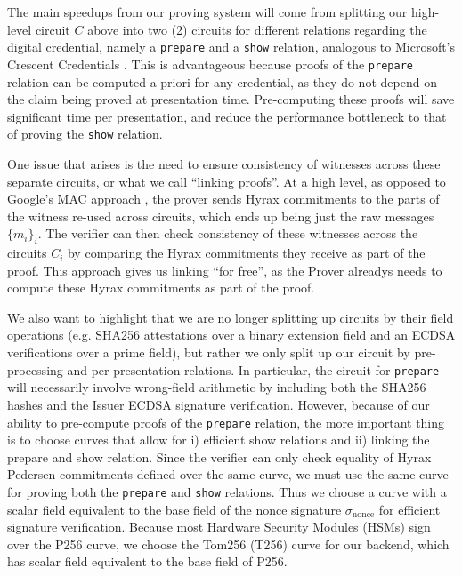 The main speedups from our proving system will come from splitting our high-level circuit $C$ above into two (2) circuits for different relations regarding the digital credential, 
namely a \texttt{prepare} and a \texttt{show} relation, analogous to Microsoft's Crescent Credentials \cite{cryptoeprint:2024/2013}. 
This is advantageous because proofs of the \texttt{prepare} relation can be computed a-priori for any credential, as they do not depend on the claim being proved at presentation time. 
Pre-computing these proofs will save significant time per presentation, and reduce the performance bottleneck to that of proving the \texttt{show} relation.

One issue that arises is the need to ensure consistency of witnesses across these separate circuits, or what we call ``linking proofs''. 
At a high level, as opposed to Google's MAC approach \cite{cryptoeprint:2024/2010}, the prover sends Hyrax commitments to the parts of the witness re-used across circuits, 
which ends up being just the raw messages $\{m_i\}_i$. 
The verifier can then check consistency of these witnesses across the circuits $C_i$ by comparing the Hyrax commitments they receive as part of the proof. 
This approach gives us linking ``for free'', as the Prover alreadys needs to compute these Hyrax commitments as part of the proof.

We also want to highlight that we are no longer splitting up circuits by their field operations 
(e.g. SHA256 attestations over a binary extension field and an ECDSA verifications over a prime field), but rather we only split up our circuit by pre-processing and per-presentation relations. 
In particular, the circuit for \texttt{prepare} will necessarily involve wrong-field arithmetic by including both the SHA256 hashes and the Issuer ECDSA signature verification. 
However, because of our ability to pre-compute proofs of the \texttt{prepare} relation, the more important thing is to choose curves that allow for i) efficient show relations and ii) linking the prepare and show relation. 
Since the verifier can only check equality of Hyrax Pedersen commitments defined over the same curve, we must use the same curve for proving both the \texttt{prepare} and \texttt{show} relations.
Thus we choose a curve with a scalar field equivalent to the base field of the nonce signature $\sigma_{\text{nonce}}$ for efficient signature verification. 
Because most Hardware Security Modules (HSMs) sign over the P256 curve, we choose the Tom256 (T256) curve for our backend, which has scalar field equivalent to the base field of P256. 

